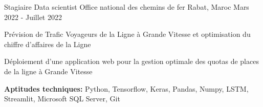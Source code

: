 

\begin{cventries}

  \cventry
    {Stagiaire Data scientist} %
    {Office national des chemins de fer} %
    {Rabat, Maroc} %
    {Mars 2022 - Juillet 2022} %
    {
      \begin{cvitems} %
        \item {Prévision de Trafic Voyageurs de la Ligne à Grande Vitesse et optimisation du chiffre d'affaires de la Ligne}
        \item {Déploiement d'une application web pour la gestion optimale des quotas de places de la ligne à Grande Vitesse}
        \item {\textbf{Aptitudes techniques:} Python, Tensorflow, Keras, Pandas, Numpy, LSTM, Streamlit, Microsoft SQL Server, Git}
      \end{cvitems}
    }


\end{cventries}

